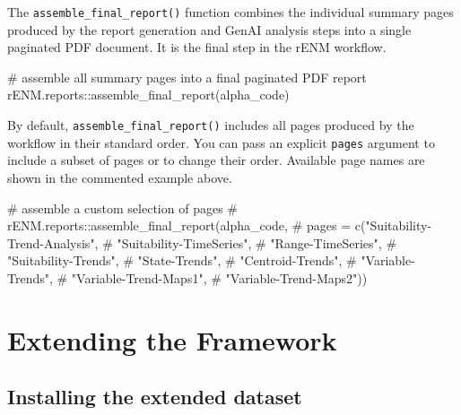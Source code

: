 \documentclass[
  letterpaper,
  DIV=11,
  numbers=noendperiod]{scrartcl}
\newenvironment{Shaded}{\begin{snugshade}}{\end{snugshade}}
\newcommand{\CommentTok}[1]{\textcolor[rgb]{0.37,0.37,0.37}{#1}}
\newcommand{\FunctionTok}[1]{\textcolor[rgb]{0.28,0.35,0.67}{#1}}
\newcommand{\NormalTok}[1]{\textcolor[rgb]{0.00,0.23,0.31}{#1}}
\newcommand{\SpecialCharTok}[1]{\textcolor[rgb]{0.37,0.37,0.37}{#1}}
\begin{document}
The \texttt{assemble\_final\_report()} function combines the individual
summary pages produced by the report generation and GenAI analysis steps
into a single paginated PDF document. It is the final step in the rENM
workflow.

\begin{Shaded}
\begin{Highlighting}[]
\CommentTok{\# assemble all summary pages into a final paginated PDF report}
\NormalTok{rENM.reports}\SpecialCharTok{::}\FunctionTok{assemble\_final\_report}\NormalTok{(alpha\_code)}
\end{Highlighting}
\end{Shaded}

By default, \texttt{assemble\_final\_report()} includes all pages
produced by the workflow in their standard order. You can pass an
explicit \texttt{pages} argument to include a subset of pages or to
change their order. Available page names are shown in the commented
example above.

\begin{Shaded}
\begin{Highlighting}[]
\CommentTok{\# assemble a custom selection of pages}
\CommentTok{\# rENM.reports::assemble\_final\_report(alpha\_code, }
\CommentTok{\#                                     pages = c("Suitability{-}Trend{-}Analysis",}
\CommentTok{\#                                               "Suitability{-}TimeSeries",}
\CommentTok{\#                                               "Range{-}TimeSeries",}
\CommentTok{\#                                               "Suitability{-}Trends",}
\CommentTok{\#                                               "State{-}Trends",}
\CommentTok{\#                                               "Centroid{-}Trends",}
\CommentTok{\#                                               "Variable{-}Trends",}
\CommentTok{\#                                               "Variable{-}Trend{-}Maps1",}
\CommentTok{\#                                               "Variable{-}Trend{-}Maps2"))}
\end{Highlighting}
\end{Shaded}

\section{Extending the Framework}\label{extending-the-framework}

\subsection{Installing the extended
dataset}\label{installing-the-extended-dataset}
\end{document}
